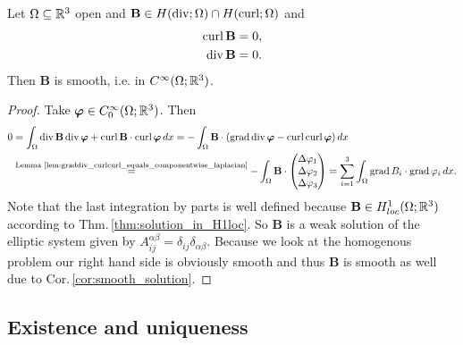 \documentclass[../master_thesis.tex]{subfiles}
\begin{document}
\begin{theorem}\label{thm:smoothness_of_solutions}
    Let $\Omega \subseteq \mathbb{R}^3$ open and 
    $\mathbf{B} \in H(\operatorname{div};\Omega) \cap H(\operatorname{curl};\Omega)$ and 
    \begin{align*}
        \operatorname{curl} \mathbf{B} &= 0,
        \\ \operatorname{div} \mathbf{B} &= 0.
    \end{align*}
    Then $\mathbf{B}$ is smooth, i.e. in $C^\infty(\Omega;\mathbb{R}^3)$.
\end{theorem}
\begin{proof}
    Take $\bm{\varphi} \in C_0^\infty(\Omega;\mathbb{R}^3)$. Then 
    \begin{align*}
        0 &= \int_\Omega \operatorname{div} \mathbf{B} \operatorname{div} \bm{\varphi} + \operatorname{curl} \mathbf{B} \cdot \operatorname{curl} \bm{\varphi} \, dx
        = - \int_\Omega \mathbf{B} \cdot (\operatorname{grad} \operatorname{div} \bm{\varphi} - \operatorname{curl} \operatorname{curl} \bm{\varphi}) \, dx
        \\ &\stackrel{\text{Lemma 
            \ref{lem:graddiv_curlcurl_equals_componentwise_laplacian}}}{=} 
            - \int_\Omega \mathbf{B} \cdot 
            \begin{pmatrix}
                \Delta \varphi_1 \\ \Delta \varphi_2 \\ \Delta \varphi_3
            \end{pmatrix}
        = \sum\limits_{i=1}^3 \int_\Omega \operatorname{grad} B_i \cdot \operatorname{grad} \varphi_i \,dx.
    \end{align*}
    Note that the last integration by parts is well defined because 
    $\mathbf{B} \in H^1_{loc}(\Omega;\mathbb{R}^3)$ according to Thm.\,\ref{thm:solution_in_H1loc}. 
    So $\mathbf{B}$ is a weak solution 
    of the elliptic system given by 
    $A_{ij}^{\alpha \beta} = \delta_{ij} \delta_{\alpha\beta}$. Because 
    we look at the homogenous problem our right hand side is obviously smooth 
    and thus $\mathbf{B}$ is smooth as well due to Cor.\,\ref{cor:smooth_solution}.
\end{proof}

\subsection{Existence and uniqueness}
\end{document}
